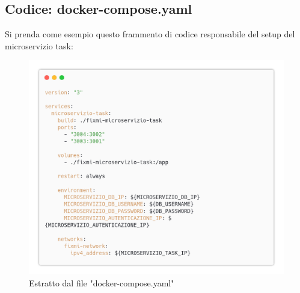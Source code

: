 \documentclass{report}
\begin{document}
\subsection*{Codice: docker-compose.yaml}

Si prenda come esempio questo frammento di codice responsabile del setup del microservizio task:
\begin{figure}[H]
	\centering\includegraphics[width=1\textwidth]{images/docker_code_01.png}
	Estratto dal file "docker-compose.yaml"
\end{figure}
\end{document}
